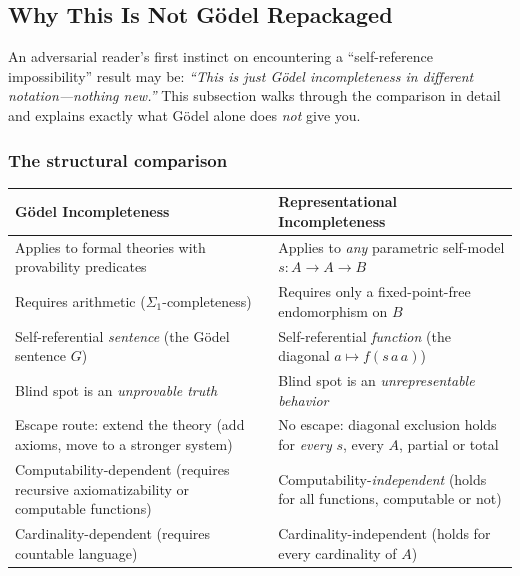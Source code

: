 \documentclass[11pt]{article}
\begin{document}
\subsection{Why This Is Not G\"odel Repackaged}
\label{sec:godel-distinction}

An adversarial reader's first instinct on encountering a
``self-reference impossibility'' result may be: \emph{``This is just
G\"odel incompleteness in different notation---nothing new.''}  This
subsection walks through the comparison in detail and explains exactly
what G\"odel alone does \emph{not} give you.

\subsubsection{The structural comparison}

\begin{center}
\setlength{\tabcolsep}{4pt}
\begin{tabular}{@{}>{\raggedright\arraybackslash}p{6.5cm}
                 >{\raggedright\arraybackslash}p{7.5cm}@{}}
\toprule
\textbf{G\"odel Incompleteness} & \textbf{Representational Incompleteness} \\
\midrule
Applies to formal theories with provability predicates &
Applies to \emph{any} parametric self-model $s : A \to A \to B$ \\[0.5ex]
Requires arithmetic ($\Sigma_1$-completeness) &
Requires only a fixed-point-free endomorphism on $B$ \\[0.5ex]
Self-referential \emph{sentence} (the G\"odel sentence $G$) &
Self-referential \emph{function} (the diagonal $a \mapsto f(s\,a\,a)$) \\[0.5ex]
Blind spot is an \emph{unprovable truth} &
Blind spot is an \emph{unrepresentable behavior} \\[0.5ex]
Escape route: extend the theory (add axioms, move to a stronger system) &
No escape: diagonal exclusion holds for \emph{every} $s$, every $A$, partial or total \\[0.5ex]
Computability-dependent (requires recursive axiomatizability or computable functions) &
Computability-\emph{independent} (holds for all functions, computable or not) \\[0.5ex]
Cardinality-dependent (requires countable language) &
Cardinality-independent (holds for every cardinality of $A$) \\
\bottomrule
\end{tabular}
\end{center}
\end{document}
